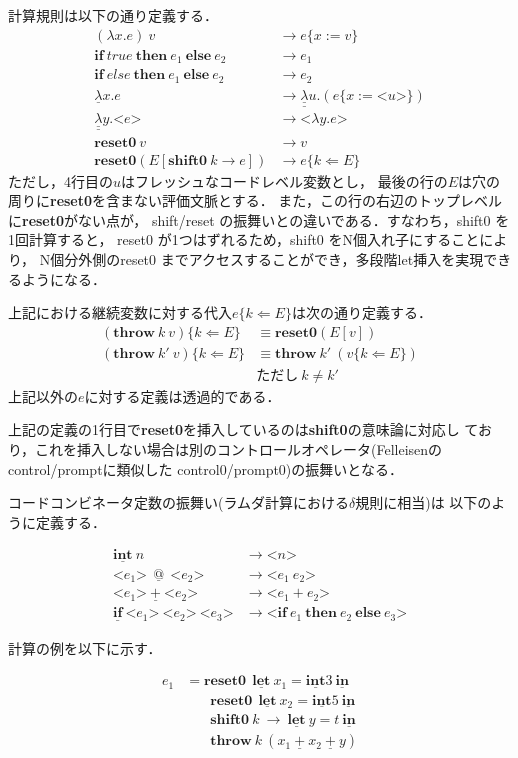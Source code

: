 \documentclass[T]{compsoft}
\makeatletter
\newcommand\fun[2]{\lambda{#1}.{#2}}
\newcommand\Resetz{\textbf{reset0}}
\newcommand\Shiftz{\textbf{shift0}}
\newcommand\Throw{\textbf{throw}}
\newcommand\throw[2]{\Throw~{#1}~{#2}}
\newcommand\cfun[2]{\underline{\lambda}{#1}.{#2}}
\newcommand\ccfun[2]{\underline{\underline{\lambda}}{#1}.{#2}}
\newcommand\cPlus{\underline{\textbf{+}}}
\newcommand\cLet{\underline{\textbf{let}}}
\newcommand\cIn{\underline{\textbf{in}}}
\newcommand\cint{\underline{\textbf{int}}}
\newcommand\code[1]{\texttt{<}{#1}\texttt{>}}
\newcommand\ift[3]{\textbf{if}~{#1}~\textbf{then}~{#2}~\textbf{else}~{#3}}
\newcommand\cif[3]{\underline{\textbf{if}}~\code{{#1}}~\code{{#2}}~\code{{#3}}}
\newcommand\cat{~\underline{@}~}
\newcommand\ksubst[2]{\{{#1}\Leftarrow{#2}\}}
\theoremstyle{break}
\makeatother
\begin{document}
計算規則は以下の通り定義する．
\begin{align*}
  (\fun{x}{e})~v &\to e\{ x := v \} \\
  \ift{true}{e_1}{e_2} &\to e_1 \\
  \ift{else}{e_1}{e_2} &\to e_2 \\
  \cfun{x}{e} &\to \ccfun{u}{(e\{ x := \code{u} \})} \\
  \ccfun{y}{\code{e}} &\to \code{\fun{y}{e}} \\
  \Resetz~ v &\to v \\
  \Resetz (E[\Shiftz~ k \to e]) &\to e \ksubst{k}{E}
\end{align*}
ただし，4行目の$u$はフレッシュなコードレベル変数とし，
最後の行の$E$は穴の周りに{\Resetz}を含まない評価文脈とする．
また，この行の右辺のトップレベルに{\Resetz}がない点が，
shift/reset の振舞いとの違いである．すなわち，shift0 を1回計算すると，
reset0 が1つはずれるため，shift0 をN個入れ子にすることにより，
N個分外側のreset0 までアクセスすることができ，多段階let挿入を実現でき
るようになる．

上記における継続変数に対する代入$e\ksubst{k}{E}$は次の通り定義する．
\begin{align*}
  (\throw{k}{v})\ksubst{k}{E} &\equiv \Resetz (E[v]) \\
  (\throw{k'}{v})\ksubst{k}{E} &\equiv \throw{k'}{(v\ksubst{k}{E})} \\
                              & \text{ただし}~k \not= k'
\end{align*}
上記以外の$e$に対する定義は透過的である．

上記の定義の1行目で\Resetz を挿入しているのは{\Shiftz}の意味論に対応し
ており，これを挿入しない場合は別のコントロールオペレータ(Felleisenの
control/promptに類似した control0/prompt0)の振舞いとなる．

コードコンビネータ定数の振舞い(ラムダ計算における$\delta$規則に相当)は
以下のように定義する．

\begin{align*}
  \cint~ n &\to \code{n} \\
  \code{e_1}~ \cat~ \code{e_2} &\to \code{e_1~ e_2} \\
  \code{e_1}~ \cPlus~ \code{e_2} &\to \code{e_1 + e_2} \\
  \cif{e_1}{e_2}{e_3} &\to \code{\ift{e_1}{e_2}{e_3}}
\end{align*}

計算の例を以下に示す．

\begin{align*}
  e_1 & = \Resetz ~~\cLet~x_1=\cint{3}~\cIn \\
      & \phantom{=}~~ \Resetz ~~\cLet~x_2=\cint{5}~\cIn \\
      & \phantom{=}~~ \Shiftz~k~\to~\cLet~y=t~\cIn \\
      & \phantom{=}~~ \Throw~ k~ (x_1~\cPlus~x_2~\cPlus~y) \\
\end{align*}
\end{document}
